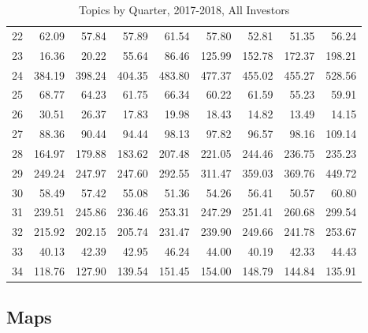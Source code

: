 \begin{table}[]
\begin{tabular}{l|rrrrrrrr}
		22 & 62.09 & 57.84 & 57.89 & 61.54 & 57.80 & 52.81 & 51.35 & 56.24 \\
		23 & 16.36 & 20.22 & 55.64 & 86.46 & 125.99 & 152.78 & 172.37 & 198.21 \\
		24 & 384.19 & 398.24 & 404.35 & 483.80 & 477.37 & 455.02 & 455.27 & 528.56 \\
		25 & 68.77 & 64.23 & 61.75 & 66.34 & 60.22 & 61.59 & 55.23 & 59.91 \\
		26 & 30.51 & 26.37 & 17.83 & 19.98 & 18.43 & 14.82 & 13.49 & 14.15 \\
		27 & 88.36 & 90.44 & 94.44 & 98.13 & 97.82 & 96.57 & 98.16 & 109.14 \\
		28 & 164.97 & 179.88 & 183.62 & 207.48 & 221.05 & 244.46 & 236.75 & 235.23 \\
		29 & 249.24 & 247.97 & 247.60 & 292.55 & 311.47 & 359.03 & 369.76 & 449.72 \\
		30 & 58.49 & 57.42 & 55.08 & 51.36 & 54.26 & 56.41 & 50.57 & 60.80 \\
		31 & 239.51 & 245.86 & 236.46 & 253.31 & 247.29 & 251.41 & 260.68 & 299.54 \\
		32 & 215.92 & 202.15 & 205.74 & 231.47 & 239.90 & 249.66 & 241.78 & 253.67 \\
		33 & 40.13 & 42.39 & 42.95 & 46.24 & 44.00 & 40.19 & 42.33 & 44.43 \\
		34 & 118.76 & 127.90 & 139.54 & 151.45 & 154.00 & 148.79 & 144.84 & 135.91
	\end{tabular}
\caption[Topics by Quarter, 2017-2018, All Investors]{Topics by Quarter, 2017-2018, All Investors}
\label{tab:Topics_investors_2017-2018}
\end{table}
	
	
	
	\subsection{Maps}

